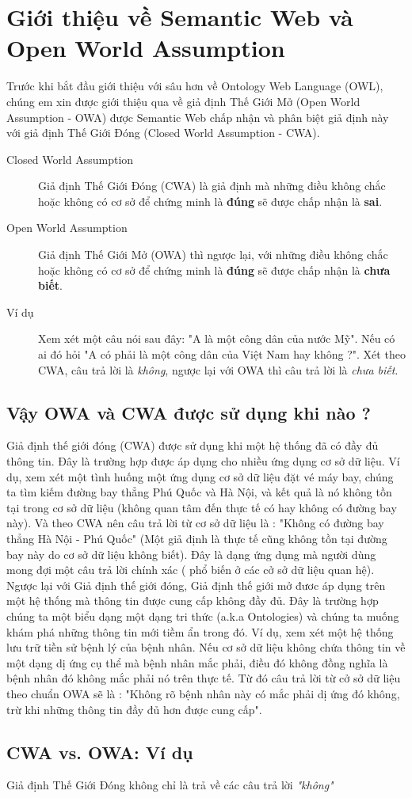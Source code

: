 \chapter{Giới thiệu về Semantic Web và Open World Assumption}
Trước khi bắt đầu giới thiệu với sâu hơn về Ontology Web Language (OWL), chúng em xin được giới thiệu qua về giả định Thế Giới Mở (Open World Assumption - OWA) được Semantic Web chấp nhận và phân biệt giả định này với giả định Thế Giới Đóng (Closed World Assumption - CWA).
\begin{description}
\item[Closed World Assumption] 
Giả định Thế Giới Đóng (CWA) là giả định mà những điều không chắc hoặc không có cơ sở để chứng minh là \textbf{đúng} sẽ được chấp nhận là \textbf{sai}.
\item[Open World Assumption]
Giả định Thế Giới Mở (OWA) thì ngược lại, với những điều không chắc hoặc không có cơ sở để chứng minh là \textbf{đúng} sẽ được chấp nhận là \textbf{chưa biết}. 
\item[Ví dụ]
Xem xét một câu nói sau đây: "A là một công dân của nước Mỹ". Nếu có ai đó hỏi "A có phải là một công dân của Việt Nam hay không ?". Xét theo CWA, câu trả lời là \textit{không}, ngược lại với OWA thì câu trả lời là \textit{chưa biết}. 
\end{description}
\section{Vậy OWA và CWA được sử dụng khi nào ?}
Giả định thế giới đóng (CWA) được sử dụng khi một hệ thống đã có đầy đủ thông tin. Đây là trường hợp được áp dụng cho nhiều ứng dụng cơ sở dữ liệu. Ví dụ, xem xét một tình huống một ứng dụng cơ sở dữ liệu đặt vé máy bay, chúng ta tìm kiếm đường bay thẳng Phú Quốc và Hà Nội, và kết quả là nó không tồn tại trong cơ sở dữ liệu (không quan tâm đến thực tế có hay không có đường bay này). Và theo CWA nên câu trả lời từ cơ sở dữ liệu là : "Không có đường bay thẳng Hà Nội - Phú Quốc" (Một giả định là thực tế cũng không tồn tại đường bay này do cơ sở dữ liệu không biết). Đây là dạng ứng dụng mà người dùng mong đợi một câu trả lời chính xác ( phổ biến ở các cở sở dữ liệu quan hệ).
Ngược lại với Giả định thế giới đóng, Giả định thế giới mở đươc áp dụng trên một hệ thống mà thông tin được cung cấp không đầy đủ. Đây là trường hợp chúng ta một biểu dạng một dạng tri thức (a.k.a Ontologies) và chúng ta muống khám phá những thông tin mới tiềm ẩn trong đó. Ví dụ, xem xét một hệ thống lưu trữ tiền sử bệnh lý của bệnh nhân. Nếu cơ sở dữ liệu không chứa thông tin về một dạng dị ứng cụ thể mà bệnh nhân mắc phải, điều đó không đồng nghĩa là bệnh nhân đó không mắc phải nó trên thực tế. Từ đó câu trả lời từ cở sở dữ liệu theo chuẩn OWA sẽ là : "Không rõ bệnh nhân này có mắc phải dị ứng đó không, trừ khi những thông tin đầy đủ hơn được cung cấp".
\section{CWA vs. OWA: Ví dụ}
Giả định Thế Giới Đóng không chỉ là trả về các câu trả lời \textit{"không"} 